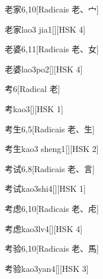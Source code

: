 \begin{entry}{老家}{6,10}[Radicais ⽼、⼧]
  \begin{phonetics}{老家}{lao3 jia1}[][HSK 4]
  \end{phonetics}
\end{entry}

\begin{entry}{老婆}{6,11}[Radicais ⽼、⼥]
  \begin{phonetics}{老婆}{lao3po2}[][HSK 4]
  \end{phonetics}
\end{entry}

\begin{entry}{考}{6}[Radical ⽼]
  \begin{phonetics}{考}{kao3}[][HSK 1]
  \end{phonetics}
\end{entry}

\begin{entry}{考生}{6,5}[Radicais ⽼、⽣]
  \begin{phonetics}{考生}{kao3 sheng1}[][HSK 2]
  \end{phonetics}
\end{entry}

\begin{entry}{考试}{6,8}[Radicais ⽼、⾔]
  \begin{phonetics}{考试}{kao3shi4}[][HSK 1]
  \end{phonetics}
\end{entry}

\begin{entry}{考虑}{6,10}[Radicais ⽼、⾌]
  \begin{phonetics}{考虑}{kao3lv4}[][HSK 4]
  \end{phonetics}
\end{entry}

\begin{entry}{考验}{6,10}[Radicais ⽼、⾺]
  \begin{phonetics}{考验}{kao3yan4}[][HSK 3]
  \end{phonetics}
\end{entry}

